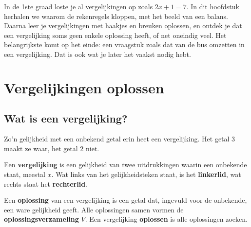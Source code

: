 In de 1ste graad loste je al vergelijkingen op zoals $2x + 1 = 7$. In dit hoofdstuk herhalen we waarom de rekenregels kloppen, met het beeld van een balans. Daarna leer je vergelijkingen met haakjes en breuken oplossen, en ontdek je dat een vergelijking soms geen enkele oplossing heeft, of net oneindig veel. Het belangrijkste komt op het einde: een vraagstuk zoals dat van de bus omzetten in een vergelijking. Dat is ook wat je later het vaakst nodig hebt.

\begin{oefeningen}[Start]

\end{oefeningen}

\section{Vergelijkingen oplossen}

\subsection{Wat is een vergelijking?}


Zo'n gelijkheid met een onbekend getal erin heet een vergelijking. Het getal 3 maakt ze waar, het getal 2 niet.

\begin{theorie}
Een \textbf{\textcolor{accent}{vergelijking}} is een gelijkheid van twee uitdrukkingen waarin een onbekende staat, meestal $x$. Wat links van het gelijkheidsteken staat, is het \textbf{\textcolor{accent}{linkerlid}}, wat rechts staat het \textbf{\textcolor{accent}{rechterlid}}.

Een \textbf{\textcolor{accent}{oplossing}} van een vergelijking is een getal dat, ingevuld voor de onbekende, een ware gelijkheid geeft. Alle oplossingen samen vormen de \textbf{\textcolor{accent}{oplossingsverzameling}} $V$. Een vergelijking \textbf{\textcolor{accent}{oplossen}} is alle oplossingen zoeken.
\end{theorie}

